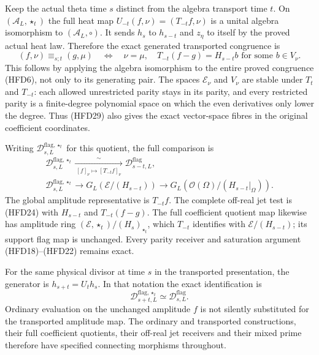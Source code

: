 Keep the actual theta time $s$ distinct
from the algebra transport time $t$.
On $(\mathcal A_L,\star_t)$ the full
heat map
$U_{-t}(f,\nu)=(T_{-t}f,\nu)$ is a
unital algebra isomorphism to
$(\mathcal A_L,\circ)$.
It sends $h_s$ to $h_{s-t}$ and
$z_\eta$ to itself by the proved
actual heat law. Therefore the exact
generated transported congruence is
\begin{equation}\tag{HFD29}
 (f,\nu)\equiv_{s;t}(g,\mu)
 \quad\Longleftrightarrow\quad
 \nu=\mu,\quad
 T_{-t}(f-g)=H_{s-t}b
                         \text{ for some }b\in V_\nu .
\end{equation}
This follows by applying the algebra
isomorphism to the entire proved
congruence (HFD6), not only to its
generating pair.
The spaces $\mathcal E_\nu$ and $V_\nu$
are stable under $T_t$ and $T_{-t}$:
each allowed unrestricted parity stays
in its parity, and every restricted
parity is a finite-degree polynomial
space on which the even derivatives
only lower the degree.
Thus (HFD29) also gives the exact
vector-space fibres in the original
coefficient coordinates.

Writing $\mathcal D^{\mathrm{flag},\star_t}_{s,L}$
for this quotient, the full comparison is
\begin{equation}\tag{HFD30}
 \begin{gathered}
 \mathcal D^{\mathrm{flag},\star_t}_{s,L}
      \xrightarrow[{\ [f]_\nu\mapsto[T_{-t}f]_\nu\ }]{\ \sim\ }
                   \mathcal D^{\mathrm{flag}}_{s-t,L},\\
 \mathcal D^{\mathrm{flag},\star_t}_{s,L}
       \longrightarrow G_L(\mathcal E/(H_{s-t}))
       \longrightarrow
          G_L(\mathcal O(\Omega)/(H_{s-t}|_\Omega)).
 \end{gathered}
\end{equation}
The global amplitude representative is $T_{-t}f$.
The complete off-real jet test is (HFD24)
with $H_{s-t}$ and $T_{-t}(f-g)$.
The full coefficient quotient map likewise
has amplitude ring
$(\mathcal E,\star_t)/(H_s)_{\star_t}$,
which $T_{-t}$ identifies with
$\mathcal E/(H_{s-t})$; its support
flag map is unchanged.
Every parity receiver and saturation
argument (HFD18)--(HFD22) remains exact.

For the same physical divisor at time
$s$ in the transported presentation,
the generator is $h_{s+t}=U_t h_s$.
In that notation the exact identification is
\begin{equation}\tag{HFD31}
 \mathcal D^{\mathrm{flag},\star_t}_{s+t,L}
       \simeq\mathcal D^{\mathrm{flag}}_{s,L}.
\end{equation}
Ordinary evaluation on the unchanged
amplitude $f$ is not silently substituted
for the transported amplitude map.
The ordinary and transported constructions,
their full coefficient quotients, their
off-real jet receivers and their mixed
prime therefore have specified connecting
morphisms throughout.
